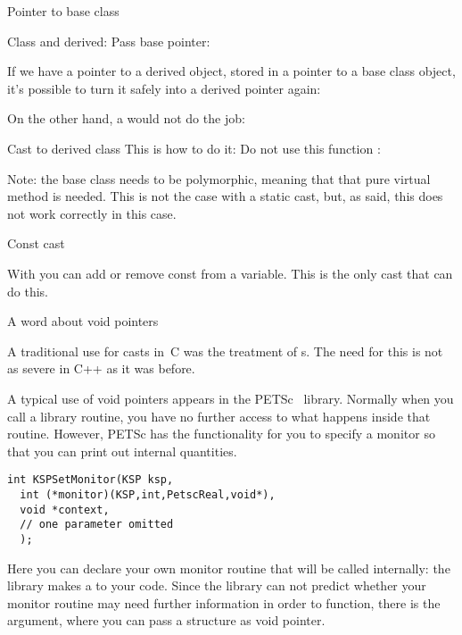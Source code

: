 \begin{slide}{Pointer to base class}
  \label{sl:dyn-base-ptr}
  \begin{multicols}{2}
    Class and derived:
    \vfill\columnbreak
    Pass base pointer:
    \vfill\hbox{}
  \end{multicols}
\end{slide}

If we have a pointer to a derived object, stored in a pointer to a
base class object, it's possible to turn it safely into a derived
pointer again:
%

On the other hand, a  would not do the job:
%

\begin{slide}{Cast to derived class}
  \label{sl:dyn-cast}
  This is how to do it:
  Do not use this function :
\end{slide}

Note: the base class needs to be polymorphic, meaning that that pure
virtual method is needed. This is not the case with a static cast,
but, as said, this does not work correctly in this case.

 {Const cast}

With  you can add or remove const from a
variable. This is the only cast that can do this.

 {A word about void pointers}

A traditional use for casts in~C was the treatment of
s. The need for this is not as severe in
C++ as it was before.

A typical use of void pointers appears in the
PETSc~\cite{petsc-efficient,petsc-home-page} library. Normally when
you call a library routine, you have no further access to what happens
inside that routine. However, PETSc has the functionality for you to
specify a monitor so that you can print out internal quantities.
\begin{verbatim}
int KSPSetMonitor(KSP ksp,
  int (*monitor)(KSP,int,PetscReal,void*),
  void *context,
  // one parameter omitted
  );
\end{verbatim}
Here you can declare your own monitor routine that will be called
internally: the library makes a  to your code.
Since the library can not predict whether your monitor routine may
need further information in order to function, there is the
 argument, where you can pass a structure as void pointer.


